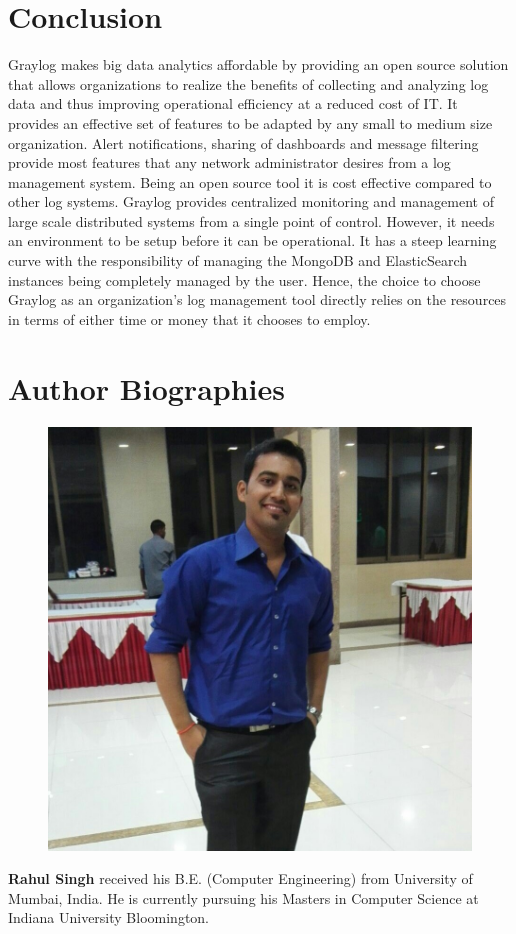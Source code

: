 \documentclass[9pt,twocolumn,twoside]{../../styles/osajnl}
\begin{document}
\section{Conclusion}
Graylog makes big data analytics affordable by providing an open
source solution that allows organizations to realize the benefits of
collecting and analyzing log data and thus improving operational
efficiency at a reduced cost of IT. It provides an effective set of
features to be adapted by any small to medium size organization. Alert
notifications, sharing of dashboards and message filtering provide
most features that any network administrator desires from a log
management system. Being an open source tool it is cost effective
compared to other log systems. Graylog provides centralized monitoring
and management of large scale distributed systems from a single point
of control. However, it needs an environment to be setup before it can
be operational. It has a steep learning curve with the responsibility
of managing the MongoDB and ElasticSearch instances being completely
managed by the user.  Hence, the choice to choose Graylog as an
organization's log management tool directly relies on the resources in
terms of either time or money that it chooses to employ.





 
\section*{Author Biographies}
\begingroup
\setlength\intextsep{0pt}
\begin{minipage}[t][3.2cm][t]{1.0\columnwidth} %
  \begin{figure}
    \includegraphics[width=0.25\columnwidth]{images/rahul_singh.jpg}
  \end{figure}
  \noindent
{\bfseries Rahul Singh} received his B.E. (Computer Engineering) from
University of Mumbai, India.  He is currently pursuing his Masters in
Computer Science at Indiana University Bloomington.

\end{minipage}
\endgroup
\end{document}
